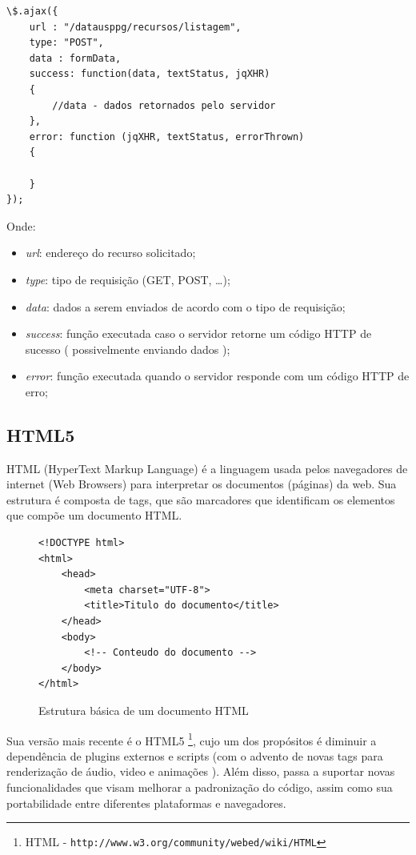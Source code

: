 \begin{verbatim}
\$.ajax({
    url : "/datausppg/recursos/listagem",
    type: "POST",
    data : formData,
    success: function(data, textStatus, jqXHR)
    {
        //data - dados retornados pelo servidor
    },
    error: function (jqXHR, textStatus, errorThrown)
    {
        
    }
});
\end{verbatim}
Onde:
\begin{itemize}
\item \emph{url}: endereço do recurso solicitado;
\item \emph{type}: tipo de requisição (GET, POST, …);
\item \emph{data}: dados a serem enviados de acordo com o tipo de requisição;
\item \emph{success}: função executada caso o servidor retorne um código HTTP de sucesso ( possivelmente enviando dados );
\item \emph{error}: função executada quando o servidor responde com um código HTTP de erro;
\end{itemize}

\subsection{HTML5}
\label{sub:h5}
HTML (HyperText Markup Language) é a linguagem usada pelos navegadores de internet (Web Browsers) para interpretar os documentos (páginas) da web. Sua estrutura é composta de tags, que são marcadores que identificam os elementos que compõe um documento HTML.

\begin{figure}[H]
\begin{verbatim}
<!DOCTYPE html>
<html>
    <head>
        <meta charset="UTF-8">
        <title>Titulo do documento</title>
    </head>
    <body>
        <!-- Conteudo do documento -->
    </body>
</html>
\end{verbatim}
\caption{Estrutura básica de um documento HTML}
\label{lst:html}
\end{figure}

Sua versão mais recente é o HTML5 \footnote{ HTML - \texttt{http://www.w3.org/community/webed/wiki/HTML}}, cujo um dos  propósitos é diminuir a dependência de plugins externos e scripts (com o advento de novas tags para renderização de áudio, video e animações ). Além disso, passa a suportar novas funcionalidades que visam melhorar a padronização do código, assim como sua portabilidade entre diferentes plataformas e navegadores.

